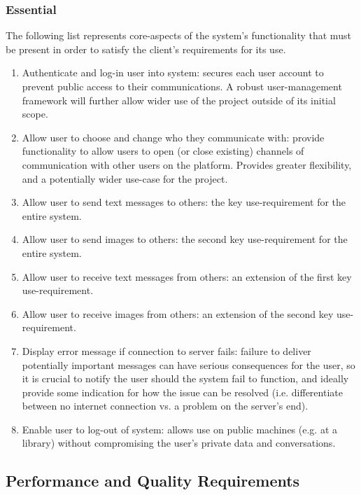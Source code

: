\documentclass[11pt]{article}
\begin{document}
\subsubsection{Essential}
The following list represents core-aspects of the system's functionality that must be present in
order to satisfy the client's requirements for its use.
\begin{enumerate}
    \item Authenticate and log-in user into system: secures each user account to prevent public
        access to their communications. A robust user-management framework will further allow
        wider use of the project outside of its initial scope.
    \item Allow user to choose and change who they communicate with: provide functionality to allow
        users to open (or close existing) channels of communication with other users on the
        platform. Provides greater flexibility, and a potentially wider use-case for the project.
    \item Allow user to send text messages to others: the key use-requirement for the entire system.
    \item Allow user to send images to others: the second key use-requirement for the entire system.
    \item Allow user to receive text messages from others: an extension of the first key
        use-requirement.
    \item Allow user to receive images from others: an extension of the second key use-requirement.
    \item Display error message if connection to server fails: failure to deliver potentially
        important messages can have serious consequences for the user, so it is crucial to notify
        the user should the system fail to function, and ideally provide some indication for how the
        issue can be resolved (i.e.  differentiate between no internet connection vs. a problem on
        the server's end).
    \item Enable user to log-out of system: allows use on public machines (e.g. at a library)
        without compromising the user's private data and conversations.
\end{enumerate}

\subsection{Performance and Quality Requirements}
\end{document}
